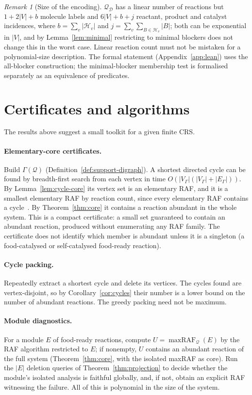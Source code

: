 \documentclass[11pt,a4paper]{article}
\theoremstyle{plain}
\theoremstyle{definition}
\theoremstyle{remark}
\newtheorem{remark}[theorem]{Remark}
\newcommand{\DD}{\mathcal D}
\newcommand{\HH}{\mathcal H}
\newcommand{\QQ}{\mathcal Q}
\newcommand{\mraf}{\operatorname{maxRAF}}
\begin{document}
\begin{remark}[Size of the encoding]
$\QQ_\DD$ has a linear number of reactions but $1+2|V|+b$ molecule labels and $6|V|+b+j$
reactant, product and catalyst incidences, where $b=\sum_v|\HH_v|$ and
$j=\sum_v\sum_{B\in\HH_v}|B|$; both can be exponential in $|V|$, and by
Lemma~\ref{lem:minimal} restricting to minimal blockers does not change this in the worst
case. Linear reaction count must not be mistaken for a polynomial-size description. The
formal statement (Appendix~\ref{app:lean}) uses the all-blocker construction; the
minimal-blocker membership test is formalised separately as an equivalence of predicates.
\end{remark}

\section{Certificates and algorithms}\label{sec:algorithms}

The results above suggest a small toolkit for a given finite CRS.

\paragraph{Elementary-core certificates.} Build $\Gamma(\QQ)$ (Definition~\ref{def:support-digraph}).
A shortest directed cycle can be found by breadth-first search from each vertex in time
$O(|V_\Gamma|(|V_\Gamma|+|E_\Gamma|))$. By Lemma~\ref{lem:cycle-core} its vertex set is an
elementary RAF, and it is a smallest elementary RAF by reaction count, since every
elementary RAF contains a cycle~\cite{steel2019autocatalytic}. By Theorem~\ref{thm:core} it
contains a reaction abundant in the whole system. This is a compact certificate: a small set
guaranteed to contain an abundant reaction, produced without enumerating any RAF family.
The certificate does not identify which member is abundant unless it is a singleton (a
food-catalysed or self-catalysed food-ready reaction).

\paragraph{Cycle packing.} Repeatedly extract a shortest cycle and delete its vertices.
The cycles found are vertex-disjoint, so by Corollary~\ref{cor:cycles} their number is a
lower bound on the number of abundant reactions. The greedy packing need not be maximum.

\paragraph{Module diagnostics.} For a module $E$ of food-ready reactions, compute
$U=\mraf_\QQ(E)$ by the RAF algorithm restricted to $E$; if nonempty, $U$ contains an
abundant reaction of the full system (Theorem~\ref{thm:core}, with the isolated maxRAF as
core). Run the $|E|$ deletion queries of Theorem~\ref{thm:projection} to decide whether the
module's isolated analysis is faithful globally, and, if not, obtain an explicit RAF
witnessing the failure. All of this is polynomial in the size of the system.
\end{document}
